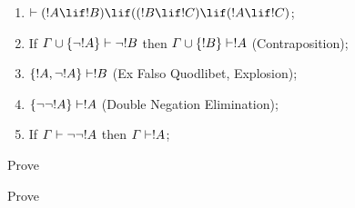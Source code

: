 \documentclass[../../../include/open-logic-section]{subfiles}
\begin{document}
\begin{prop}
\begin{enumerate}
\item $\Proves (!A \lif !B) \lif ((!B \lif !C)
  \lif (!A \lif !C)$; 
\item If $\Gamma \cup \{ \lnot !A\}
  \Proves \lnot !B$ then $\Gamma \cup \{ !B\} \Proves
  !A$ (Contraposition); 
\item  $\{ !A, \lnot!A\} \Proves
    !B$ (Ex Falso Quodlibet, Explosion); 
\item  $\{ \lnot\lnot!A\} \Proves
  !A$ (Double Negation Elimination);
\item If $\Gamma \Proves \lnot\lnot!A$ then $\Gamma \Proves
  !A$;
\end{enumerate}
\end{prop}

\begin{prob}
  Prove 
\end{prob}
\tagendprob

\begin{prob}
  Prove 
\end{prob}
\tagendprob
\end{document}
